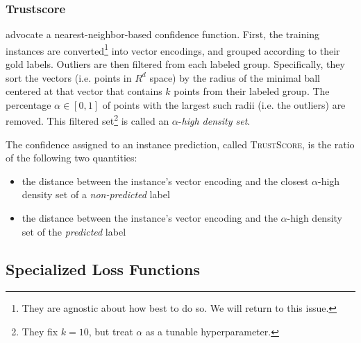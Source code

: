 \documentclass[11pt]{article}
\begin{document}
\subsubsection*{Trustscore}

\cite{jiang2018trust} advocate a nearest-neighbor-based confidence function. First, the training instances are converted\footnote{They are agnostic about how best to do so. We will return to this issue.} into vector encodings, and grouped according to their gold labels. Outliers are then filtered from each labeled group. Specifically, they sort the vectors (i.e. points in $R^d$ space) by the radius of the minimal ball centered at that vector that contains $k$ points from their labeled group. The percentage $\alpha \in [0, 1]$ of points with the largest such radii (i.e. the outliers) are removed. This filtered set\footnote{They fix $k=10$, but treat $\alpha$ as a tunable hyperparameter.} is called an $\alpha$-\emph{high density set}.

The confidence assigned to an instance prediction, called \textsc{TrustScore}, is the ratio of the following two quantities:
\begin{itemize}
	\item the distance between the instance's vector encoding and the closest $\alpha$-high density set of a \emph{non-predicted} label
	\item the distance between the instance's vector encoding and the $\alpha$-high density set of the \emph{predicted} label
\end{itemize}



\subsection{Specialized Loss Functions}
\end{document}
